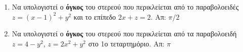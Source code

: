 \begin{enumerate}
  \item Να υπολογιστεί ο \textbf{όγκος} του στερεού που περικλείεται από το 
    παραβολοειδές  $ z = (x-1)^{2}+y^{2} $ και το επίπεδο $ 2x+z=2 $.
    \hfill Απ: $ {\pi}/{2} $

  \item Να υπολογιστεί ο \textbf{όγκος} του στερεού που περικλείεται από τα παραβολοειδή 
    $ z = 4 -y^{2} $, $ z = 2x^{2}+y^{2} $ στο 1ο τεταρτημόριο. 
    \hfill Απ: $ \pi $ 


\end{enumerate}


